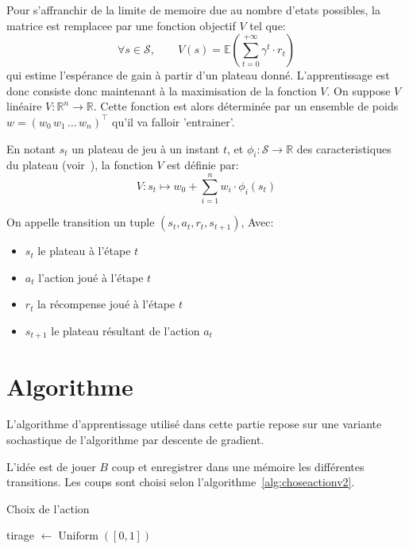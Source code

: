 \documentclass{report}
\newcommand{\R}{\mathbb{R}}
\DeclareMathOperator{\argmax}{argmax}
\DeclareMathOperator{\uniform}{Uniform}
\begin{document}
Pour s'affranchir de la limite de memoire due au nombre d'etats possibles, la
matrice est remplacee par une fonction objectif \( V \) tel que:
\[
\forall s \in \mathcal{S}, \qquad V(s) =
\mathbb{E}(\sum_{t=0}^{+\infty} \gamma ^t \cdot r_t)
\]
qui estime l'espérance de gain à partir d'un plateau donné.
L'apprentissage est donc consiste donc maintenant à la maximisation de la
fonction \( V \).
On suppose \( V \) linéaire \(V \colon \R^n \to \R\). Cette fonction est alors
déterminée par un ensemble de poids \(w = (w_0\, w_1\, \dots\, w_n)^\top\)
qu'il va falloir 'entrainer'.

En notant \( s_t \) un plateau de jeu à un instant \( t \), et
\(\phi_i\colon \mathcal{S} \to \R\) des caracteristiques du plateau
(voir~\cite{boumaza13}), la fonction \(V\)
est définie par:
\[
  V \colon s_t \mapsto w_0 + \sum_{i=1}^n w_i \cdot \phi_i (s_t)
\]

On appelle transition un tuple \( (s_t, a_t, r_t, s_{t+1}) \), Avec:
\begin{itemize}
    \item \( s_t \) le plateau à l'étape \( t \)
    \item \( a_t \) l'action joué à l'étape \( t \)
    \item \( r_t \) la récompense joué à l'étape \( t \)
    \item \( s_{t+1} \) le plateau résultant de l'action \( a_t \)
\end{itemize}


\section{Algorithme}

L'algorithme d'apprentissage utilisé dans cette partie repose sur une variante
sochastique de l'algorithme par descente de gradient.

L'idée est de jouer \( B \) coup et enregistrer dans une mémoire les différentes
transitions. Les coups sont choisi selon l'algorithme~\ref{alg:choseactionv2}.

\begin{algorithm}[h]
  \caption{Choix de l'action}\label{alg:choseactionv2}
  \begin{algorithmic}
    [1]
    \State{} tirage \(\gets \uniform([0, 1])\)
    \State{}\Return{\(\argmax_{{a_t}\in\mathcal{A}} [r_t + \gamma V(s_{t+1})] \)}
    \\ 
    \Else{}
    \State{}\Return{\(\uniform(\mathcal{A})\)}
    \EndIf{}
    \EndProcedure{}
  \end{algorithmic}
\end{algorithm}
\end{document}
